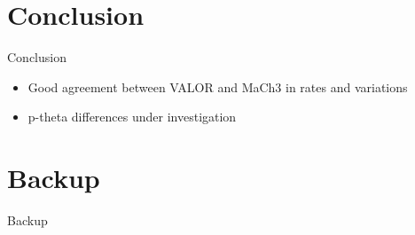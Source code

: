 \documentclass{beamer}
\begin{document}
\section{Conclusion}
\begin{frame}{Conclusion}
	\centering
	\begin{itemize}
		\item Good agreement between VALOR and MaCh3 in rates and variations
		\item p-theta differences under investigation
	\end{itemize}
\end{frame}

\section{Backup}
\begin{frame}
	\centering
	\Large Backup
\end{frame}
\end{document}
